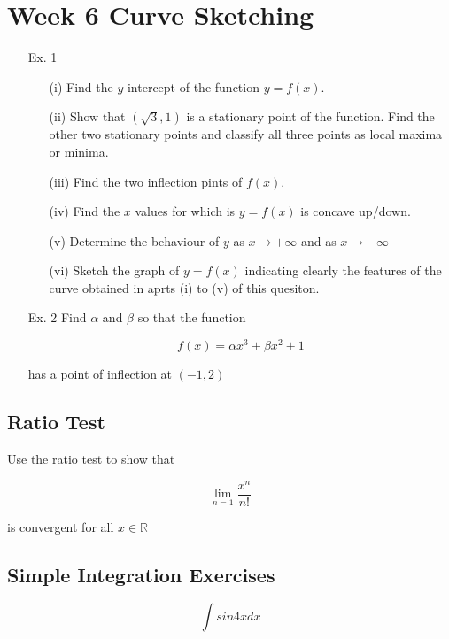 \documentclass[]{article}
\begin{document}
\section{Week 6 Curve Sketching}
\begin{itemize}
	\item[Ex. 1]
\begin{itemize}
	\item[(i)] Find the $y$ intercept of the function $y=f(x)$.
	\item[(ii)] Show that $(\sqrt{3},1)$ is a stationary point of the function. Find the other two stationary points and classify all
	three points as local maxima or minima.
	\item[(iii)] Find the two inflection pints of $f(x)$.
	\item[(iv)] Find the $x$ values for which is $y=f(x)$ is concave up/down.
	\item[(v)] Determine the behaviour of $y$ as $x \rightarrow + \infty$ and as $x \rightarrow -\infty$ 
	\item[(vi)] Sketch the graph of $y = f(x)$ indicating clearly the features of the curve obtained in aprts (i) to (v) of this quesiton.
\end{itemize}


\item[Ex. 2] Find $\alpha$ and $\beta$ so that the function 

\begin{displaymath}f(x) = \alpha x^3 + \beta x^2+1\end{displaymath}

has a point of inflection at  $\displaystyle \left(-1,2\right)$
\end{itemize}
\subsection*{Ratio Test}

Use the ratio test to show that

\[ \lim\limits_{n=1} \frac{x^n}{n!} \]

is convergent for all $x \in \mathbb{R}$


\subsection*{Simple Integration Exercises}
\[  \int sin 4x dx \]
\end{document}
